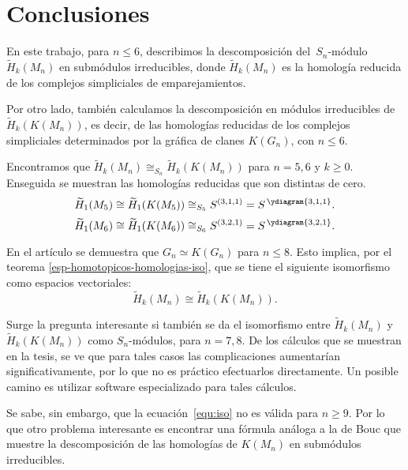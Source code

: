 \documentclass[12pt]{book}
\theoremstyle{definition}
\newcounter{in}
\begin{document}
\chapter*{Conclusiones}
 
En este trabajo, para $n\leq 6$, describimos la descomposición 
del~$S_{n}$-módulo~$\widetilde H_{k}(M_{n})$ en submódulos irreducibles, donde
$\widetilde H_{k}(M_{n})$ es la homología reducida de los complejos simpliciales
de emparejamientos.

Por otro lado, también calculamos la descomposición en módulos
irreducibles de $\widetilde H_{k}(K(M_{n}))$, es decir, de las
homologías reducidas de los complejos simpliciales determinados por
la gráfica de clanes $K(G_{n})$, con $n\leq 6$.

Encontramos que $\widetilde H_{k}(M_{n})\cong_{S_n} \widetilde H_{k}(K(M_{n}))$ para
$n=5,6$ y $k\geq0$. Enseguida se muestran las homologías reducidas que son distintas de cero.
\begin{equation*}
  \widetilde H_{1}(M_{5})\cong\widetilde H_{1}(K(M_{5}))\cong_{S_{5}} S^{(3,1,1)}=S^{\,\ydiagram{3,1,1}}.
\end{equation*}
\begin{equation*}
  \widetilde H_{1}(M_{6})\cong\widetilde H_{1}(K(M_{6}))\cong_{S_{6}} S^{(3,2,1)}=S^{\,\ydiagram{3,2,1}}.
\end{equation*}

En el artículo \cite{larrion2009clique} se demuestra que $G_{n}\simeq
K(G_{n})$ para $n\leq 8$. Esto implica, por el teorema
\ref{esp-homotopicos-homologias-iso}, que
se tiene el siguiente isomorfismo como espacios vectoriales:
\begin{equation}
  \label{equ:iso}
  \widetilde H_{k}(M_{n})\cong \widetilde H_{k}(K(M_{n})).
\end{equation}

Surge la pregunta interesante si también se da el isomorfismo entre
$\widetilde H_{k}(M_{n})$ y $\widetilde H_{k}(K(M_{n}))$ como
$S_{n}$-módulos, para $n=7,8$. De los cálculos que se muestran en la
tesis, se ve que para tales casos las complicaciones aumentarían
significativamente, por lo que no es práctico efectuarlos
directamente. Un posible camino es utilizar software especializado
para tales cálculos. 

Se sabe, sin embargo, que la ecuación~\ref{equ:iso} no es válida para
$n\geq 9$. Por lo que otro problema interesante es encontrar una
fórmula análoga a la de Bouc que muestre la descomposición de las
homologías de $K(M_{n})$ en submódulos irreducibles.





\printindex
\end{document}
